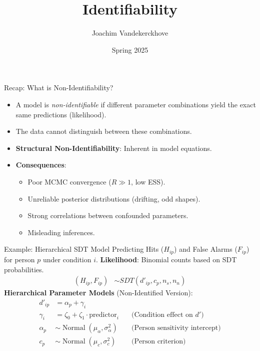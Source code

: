 \documentclass[aspectratio=169]{beamer}
\title{Identifiability}
\author{Joachim Vandekerckhove}
\date{Spring 2025}
\DeclareMathOperator{\Normal}{Normal}
\begin{document}
\maketitle

\begin{frame}{Recap: What is Non-Identifiability?}
  \begin{itemize}
    \item A model is \emph{non-identifiable} if different parameter combinations yield the exact same predictions (likelihood).
    \pause
    \item The data cannot distinguish between these combinations. \pause
    \item \textbf{Structural Non-Identifiability}: Inherent in model equations. \pause
    \item \textbf{Consequences}:
          \begin{itemize}[label=--, itemsep=0.5ex] %
              \item Poor MCMC convergence ($\hat{R} \gg 1$, low ESS).
              \item Unreliable posterior distributions (drifting, odd shapes).
              \item Strong correlations between confounded parameters.
              \item Misleading inferences.
          \end{itemize}
  \end{itemize}
\end{frame}

\begin{frame}[fragile]{Example: Hierarchical SDT Model}
  Predicting Hits ($H_{ip}$) and False Alarms ($F_{ip}$) for person $p$ under condition $i$. \pause
  \textbf{Likelihood}: Binomial counts based on SDT probabilities.
  \begin{align*}
    \left(H_{ip}, F_{ip}\right) &\sim SDT\left(d'_{ip}, c_p, n_s, n_n\right)
  \end{align*} \pause
  \textbf{Hierarchical Parameter Models} (Non-Identified Version):
  \begin{align*}
    d'_{ip} &= \alpha_p + \gamma_i \\
    \gamma_i &= \zeta_0 + \zeta_1 \cdot \text{predictor}_i \quad &\text{(Condition effect on } d')\\
    \alpha_p &\sim \Normal(\mu_\alpha, \sigma^2_\alpha) \quad &\text{(Person sensitivity intercept)}\\
    c_p &\sim \Normal(\mu_c, \sigma^2_c) \quad &\text{(Person criterion)}
  \end{align*}
\end{frame}
\end{document}
